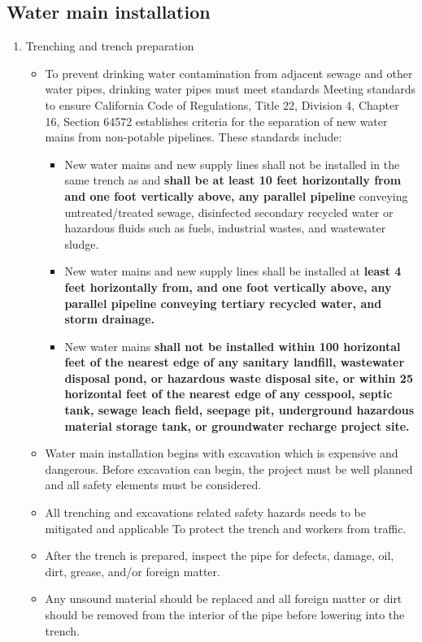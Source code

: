 \subsection{Water main installation} 
\begin{enumerate}
\item Trenching and trench preparation
\begin{itemize}
\item To prevent drinking water contamination from adjacent sewage and other water pipes, drinking water pipes must meet standards Meeting standards to ensure California Code of Regulations, Title 22,
Division 4, Chapter 16, Section 64572 establishes criteria for the separation of new water mains from non-potable pipelines. These standards include:
\begin{itemize}
\item New water mains and new supply lines shall not be installed in the same trench as and \textbf{shall be at least 10 feet horizontally from and one foot vertically above, any parallel pipeline} conveying untreated/treated sewage, disinfected secondary recycled water or hazardous fluids such as fuels, industrial wastes, and wastewater sludge.
\item New water mains and new supply lines shall be installed at \textbf{least 4 feet horizontally from, and one foot vertically above, any parallel pipeline conveying tertiary recycled water, and storm drainage.}
\item New water mains \textbf{shall not be installed within 100 horizontal feet of the nearest edge of any sanitary landfill, wastewater disposal pond, or hazardous waste disposal site, or within 25 horizontal feet of the nearest edge of any cesspool, septic tank, sewage leach field, seepage pit, underground hazardous material storage tank, or groundwater recharge project site.}
\end{itemize}
\item Water main installation begins with excavation which is expensive and dangerous.  Before excavation can begin, the project must be well planned and all safety elements must be considered.
\item All trenching and excavations related safety hazards needs to be mitigated and applicable  To protect the trench and workers from traffic.
\item After the trench is prepared, inspect the pipe for defects, damage, oil, dirt, grease, and/or foreign matter.
\item Any unsound material should be replaced and all foreign matter or dirt should be removed from the interior of the pipe before lowering into the trench.

\end{itemize}
\end{enumerate}
